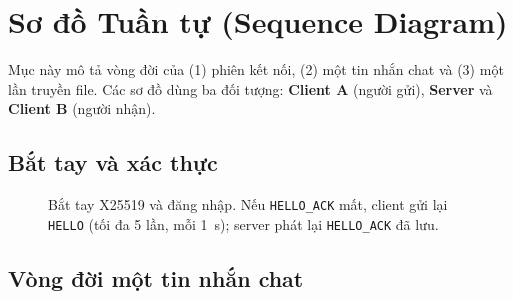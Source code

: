 \section{Sơ đồ Tuần tự (Sequence Diagram)}

Mục này mô tả vòng đời của (1) phiên kết nối, (2) một tin nhắn chat và (3) một lần truyền file. Các sơ đồ dùng ba đối tượng: \textbf{Client A} (người gửi), \textbf{Server} và \textbf{Client B} (người nhận).

\newcommand{\seqlife}[3]{%
  \node[draw, fill=gray!15, minimum width=2.4cm, font=\small\bfseries] at (#1,0) {#2};
  \draw[dashed, gray] (#1,-0.35) -- (#1,-#3);}
\newcommand{\seqmsg}[5]{%
  \draw[#5, ->, >=stealth] (#1,-#3) -- node[above, font=\scriptsize, align=center]{#4} (#2,-#3);}
\newcommand{\seqnote}[4]{%
  \node[draw, fill=yellow!20, font=\scriptsize, text width=#3, align=center, inner sep=2pt] at (#1,-#2) {#4};}

\subsection{Bắt tay và xác thực}

\begin{figure}[H]
\centering
{}
\caption{Bắt tay X25519 và đăng nhập. Nếu \texttt{HELLO\_ACK} mất, client gửi lại \texttt{HELLO} (tối đa 5 lần, mỗi 1~s); server phát lại \texttt{HELLO\_ACK} đã lưu.}
\label{fig:seq_handshake}
\end{figure}

\subsection{Vòng đời một tin nhắn chat}

